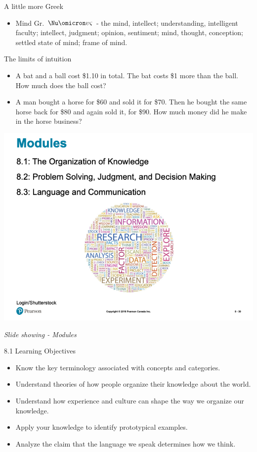 \documentclass[
]{book}
\providecommand{\tightlist}{%
  \setlength{\itemsep}{0pt}\setlength{\parskip}{0pt}}
\begin{document}
\begin{reflect}
A little more Greek

\begin{itemize}
\tightlist
\item
  Mind Gr. \(\Nu\omicron\upsilon\varsigma\) - the mind, intellect; understanding, intelligent faculty; intellect, judgment; opinion, sentiment; mind, thought, conception; settled state of mind; frame of mind.
\end{itemize}

The limits of intuition

\begin{itemize}
\tightlist
\item
  A bat and a ball cost \$1.10 in total. The bat costs \$1 more than the ball. How much does the ball cost?\\
\item
  A man bought a horse for \$60 and sold it for \$70. Then he bought the same horse back for \$80 and again sold it, for \$90. How much money did he make in the horse business?
\end{itemize}

\includegraphics{assets/unit_1/slide_39.png}

\emph{Slide showing - Modules}

8.1 Learning Objectives

\begin{itemize}
\tightlist
\item
  Know the key terminology associated with concepts and categories.\\
\item
  Understand theories of how people organize their knowledge about the world.\\
\item
  Understand how experience and culture can shape the way we organize our knowledge.\\
\item
  Apply your knowledge to identify prototypical examples.\\
\item
  Analyze the claim that the language we speak determines how we think.
\end{itemize}


\end{reflect}
\end{document}
